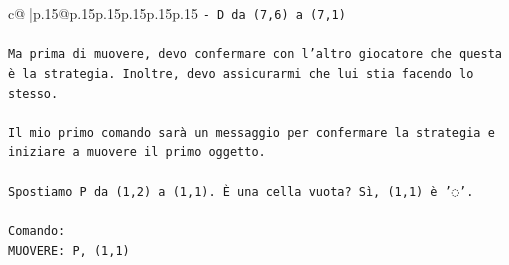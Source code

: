 \documentclass{article}
\begin{document}
{\begin{supertabular}{c@{$\;$}|p{.15\linewidth}@{}p{.15\linewidth}p{.15\linewidth}p{.15\linewidth}p{.15\linewidth}p{.15\linewidth}}
{{{\texttt{{-} D da (7,6) a (7,1)} \\
\\ 
\texttt{Ma prima di muovere, devo confermare con l'altro giocatore che questa è la strategia. Inoltre, devo assicurarmi che lui stia facendo lo stesso.} \\
\\ 
\texttt{Il mio primo comando sarà un messaggio per confermare la strategia e iniziare a muovere il primo oggetto.} \\
\\ 
\texttt{Spostiamo P da (1,2) a (1,1). È una cella vuota? Sì, (1,1) è '◌'.} \\
\\ 
\texttt{Comando:} \\
\texttt{MUOVERE: P, (1,1)} \\
            }
        }
    }
     \\ \\


\end{supertabular}}
\end{document}
